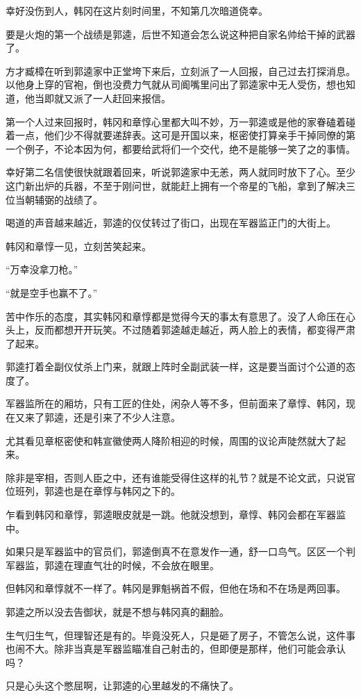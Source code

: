 幸好没伤到人，韩冈在这片刻时间里，不知第几次暗道侥幸。

要是火炮的第一个战绩是郭逵，后世不知道会怎么说这种把自家名帅给干掉的武器了。

方才臧樟在听到郭逵家中正堂垮下来后，立刻派了一人回报，自己过去打探消息。以他身上穿的官袍，倒也没费力气就从司阍嘴里问出了郭逵家中无人受伤，想也知道，他当即就又派了一人赶回来报信。

第一个人过来回报时，韩冈和章惇心里都大叫不妙，万一郭逵或是他的家眷磕着碰着一点，他们少不得就要递辞表。这可是开国以来，枢密使打算亲手干掉同僚的第一个例子，不论本因为何，都要给武将们一个交代，绝不是能够一笑了之的事情。

幸好第二名信使很快就跟着回来，听说郭逵家中无恙，两人就同时放下了心。至少这门新出炉的兵器，不至于刚问世，就能赶上拥有一个帝星的飞船，拿到了解决三位当朝辅弼的战绩了。

喝道的声音越来越近，郭逵的仪仗转过了街口，出现在军器监正门的大街上。

韩冈和章惇一见，立刻苦笑起来。

“万幸没拿刀枪。”

“就是空手也赢不了。”

苦中作乐的态度，其实韩冈和章惇都是觉得今天的事太有意思了。没了人命压在心头上，反而都想开开玩笑。不过随着郭逵越走越近，两人脸上的表情，都变得严肃了起来。

郭逵打着全副仪仗杀上门来，就跟上阵时全副武装一样，这是要当面讨个公道的态度了。

军器监所在的厢坊，只有工匠的住处，闲杂人等不多，但前面来了章惇、韩冈，现在又来了郭逵，还是引来了不少人注意。

尤其看见章枢密使和韩宣徽使两人降阶相迎的时候，周围的议论声陡然就大了起来。

除非是宰相，否则人臣之中，还有谁能受得住这样的礼节？就是不论文武，只说官位班列，郭逵也是在章惇与韩冈之下的。

乍看到韩冈和章惇，郭逵眼皮就是一跳。他就没想到，章惇、韩冈会都在军器监中。

如果只是军器监中的官员们，郭逵倒真不在意发作一通，舒一口鸟气。区区一个判军器监，郭逵在理直气壮的时候，不会放在眼里。

但韩冈和章惇就不一样了。韩冈是罪魁祸首不假，但他在场和不在场是两回事。

郭逵之所以没去告御状，就是不想与韩冈真的翻脸。

生气归生气，但理智还是有的。毕竟没死人，只是砸了房子，不管怎么说，这件事也闹不大。除非当真是军器监瞄准自己射击的，但即便是那样，他们可能会承认吗？

只是心头这个憋屈啊，让郭逵的心里越发的不痛快了。

